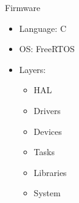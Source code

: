 
\begin{frame}{Firmware}

    \begin{itemize}
        \item Language: C
        \vspace{0.3cm}
        \item OS: FreeRTOS
        \vspace{0.3cm}
        \item Layers:
            \begin{itemize}
                \item HAL
                \vspace{0.2cm}
                \item Drivers
                \vspace{0.2cm}
                \item Devices
                \vspace{0.2cm}
                \item Tasks
                \vspace{0.2cm}
                \item Libraries
                \vspace{0.2cm}
                \item System
            \end{itemize}
    \end{itemize}

\end{frame}


